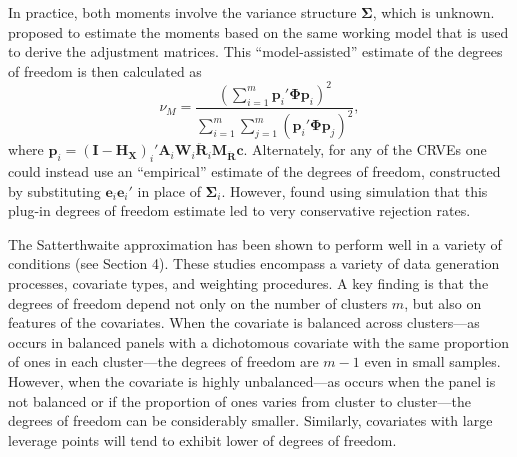 \documentclass[draft]{ectaart}\usepackage[]{graphicx}\usepackage[]{color}
\newcommand{\bm}{\mathbf}
\newcommand{\bs}{\boldsymbol}
\begin{document}
In practice, both moments involve the variance structure $\bs\Sigma$, which is unknown. 
\citet{Bell2002bias} proposed to estimate the moments based on the same working model that is used to derive the adjustment matrices. 
This ``model-assisted'' estimate of the degrees of freedom is then calculated as 
\begin{equation}
\label{eq:nu_model}
\nu_{M} = \frac{\left(\sum_{i=1}^m \bm{p}_i' \bs\Phi \bm{p}_i\right)^2}{\sum_{i=1}^m \sum_{j=1}^m \left(\bm{p}_i' \bs\Phi \bm{p}_j\right)^2},
\end{equation}
where $\bm{p}_i = \left(\bm{I} - \bm{H_X}\right)_i'\bm{A}_i \bm{W}_i\bm{\ddot{R}}_i\bm{M_{\ddot{R}}} \bm{c}$.
\todo{Can we use $\bm{H_{\ddot{U}}}$ here instead?} 
Alternately, for any of the CRVEs one could instead use an ``empirical'' estimate of the degrees of freedom, constructed by substituting $\bm{e}_i \bm{e}_i'$ in place of $\bs\Sigma_i$. 
However, \citet{Bell2002bias} found using simulation that this plug-in degrees of freedom estimate led to very conservative rejection rates. 

The \citet{Bell2002bias} Satterthwaite approximation has been shown to perform well in a variety of conditions (see Section 4). 
These studies encompass a variety of data generation processes, covariate types, and weighting procedures. 
A key finding is that the degrees of freedom depend not only on the number of clusters $m$, but also on features of the covariates. 
When the covariate is balanced across clusters---as occurs in balanced panels with a dichotomous covariate with the same proportion of ones in each cluster---the degrees of freedom are $m - 1$ even in small samples. 
However, when the covariate is highly unbalanced---as occurs when the panel is not balanced or if the proportion of ones varies from cluster to cluster---the degrees of freedom can be considerably smaller. 
Similarly, covariates with large leverage points will tend to exhibit lower of degrees of freedom. 
\end{document}
